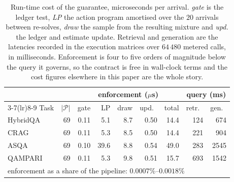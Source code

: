 \begin{table}[t]
\centering
\caption{Run-time cost of the guarantee, microseconds per arrival. \emph{gate} is the ledger test, \emph{LP} the action program amortised over the $20$ arrivals between re-solves, \emph{draw} the sample from the resulting mixture and \emph{upd.} the ledger and estimate update. Retrieval and generation are the latencies recorded in the execution matrices over $64\,480$ metered calls, in milliseconds. Enforcement is four to five orders of magnitude below the query it governs, so the contract is free in wall-clock terms and the cost figures elsewhere in this paper are the whole story.}
\label{tab:overhead}
\footnotesize
\setlength{\tabcolsep}{4pt}
\begin{tabular}{lrrrrrrrr}
\toprule
 & & \multicolumn{5}{c}{enforcement ($\mu$s)} & \multicolumn{2}{c}{query (ms)} \\
\cmidrule(lr){3-7}\cmidrule(lr){8-9}
Task & $|\mathcal{P}|$ & gate & LP & draw & upd.\ & total & retr.\ & gen.\ \\
\midrule
HybridQA & 69 & 0.11 & 5.1 & 8.7 & 0.50 & 14.4 & 124 & 674 \\
CRAG & 69 & 0.11 & 5.3 & 8.5 & 0.50 & 14.4 & 221 & 904 \\
ASQA & 69 & 0.10 & 39.6 & 8.8 & 0.54 & 49.0 & 283 & 2545 \\
QAMPARI & 69 & 0.11 & 5.3 & 9.8 & 0.51 & 15.7 & 693 & 1542 \\
\midrule
\multicolumn{9}{l}{enforcement as a share of the pipeline: $0.0007\%$--$0.0018\%$} \\
\bottomrule
\end{tabular}
\end{table}
